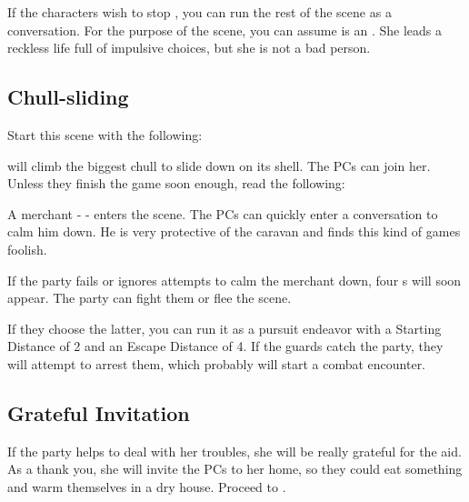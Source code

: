 If the characters wish to stop \npcTroublemaker{}, you can run the rest of the scene as a conversation.
For the purpose of the scene, you can assume \npcTroublemaker{} is an \enemyExpert{}.
She leads a reckless life full of impulsive choices, but she is not a bad person.




\subsection{Chull-sliding}

Start this scene with the following:


\npcTroublemaker{} will climb the biggest chull to slide down on its shell. The PCs can join her. Unless they finish the game soon enough, read the following:


A merchant - \enemyExpert{} - enters the scene. The PCs can quickly enter a conversation to calm him down. 
He is very protective of the caravan and finds this kind of games foolish.


If the party fails or ignores attempts to calm the merchant down, four \enemyWallGuard{}s will soon appear. The party can fight them or flee the scene. 

If they choose the latter, you can run it as a pursuit endeavor with a Starting Distance of 2 and an Escape Distance of 4. If the guards catch the party, they will attempt to arrest them, which probably will start a combat encounter.



\subsection{Grateful Invitation}

If the party helps \npcTroublemaker{} to deal with her troubles, she will be really grateful for the aid. As a thank you, she will invite the PCs to her home, so they could eat something and warm themselves in a dry house. Proceed to .